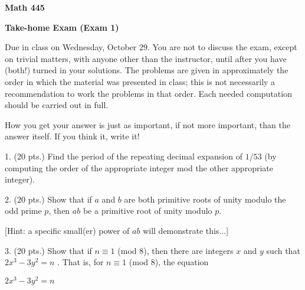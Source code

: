 
\nopagenumbers


\def\nidt{\noindent}
\def\itt{item}
\def\ctln{\centerline}
\def\u{\underbar}
\def\ssk{\smallskip}
\def\msk{\medskip}
\def\bsk{\bigskip}
\def\hsk{\hskip.1in}
\def\hhsk{\hskip.2in}
\def\dsl{\displaystyle}


\loadmsbm


\ctln{\bf Math 445}

\msk

\ctln{\bf Take-home Exam (Exam 1)}

\msk

{\narrower Due in class on Wednesday, October 29. You are not to discuss
the exam, except on trivial matters, with anyone other than the instructor, 
until after you have (both!) turned in your solutions. The problems are given in 
approximately the order in which the material was presented
in class; this is not necessarily a recommendation to work the problems 
in that order. Each needed computation should be carried out in full.\par}

\msk

How you get your answer is just 
as important, if not more important, than the 
answer itself. If you think it, write it!

\bsk


\item{1.} (20 pts.) Find the period of the repeating decimal expansion of $1/53$ (by computing the order of
the appropriate integer mod the other appropriate integer). 

\bsk

\item{2.} (20 pts.) Show that if $a$ and $b$ are both primitive roots of unity modulo
the odd prime $p$, then $ab$  be a primitive root of unity modulo $p$.

\ssk

\item{} [Hint: a specific small(er) power of $ab$ will demonstrate this...]

\bsk

\item{3.} (20 pts.)  Show that if $n\equiv 1$ (mod 8), then there are  
integers $x$ and $y$ such that $2x^3-3y^2=n$ . That is, for $n\equiv 1$ (mod 8),
the equation 

\ssk

\ctln{$2x^3-3y^2=n$}

